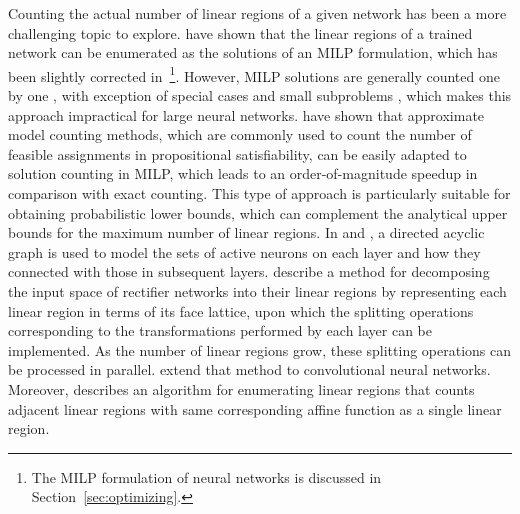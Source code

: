 Counting the actual number of linear regions of a given network has been a more challenging topic to explore. 
\cite{serra2018bounding} have shown that the linear regions of a trained network can be enumerated as the solutions of an MILP formulation, 
which has been slightly corrected in~\cite{cai2023pruning}\footnote{The MILP formulation of neural networks is discussed in Section~\ref{sec:optimizing}.}. 
However, MILP solutions are generally counted one by one \citep{danna2007multiple}, with exception of special cases \citep{serra2020nearoptimal} and small subproblems \citep{serra2020enumerative}, which makes this approach impractical for large neural networks. 
\cite{serra2020empirical} have shown that approximate model counting methods, which are commonly used to count the number of feasible assignments in propositional satisfiability, can be easily adapted to solution counting in MILP, which leads to an order-of-magnitude speedup in comparison with exact counting. 
This type of approach is particularly suitable for obtaining probabilistic lower bounds, which can complement the analytical upper bounds for the maximum number of linear regions.  
In \cite{craighero2020compositional} and \cite{craighero2020understanding}, a directed acyclic graph is used to model the sets of active neurons on each layer and how they connected with those in subsequent layers. 
\cite{yang2020reachability} describe a method for decomposing the input space of rectifier networks into their linear regions by representing each linear region in terms of its face lattice, upon which the splitting operations corresponding to the transformations performed by each layer can be implemented. As the number of linear regions grow, these splitting operations can be processed in parallel. \cite{yang2021reachability} extend that method to convolutional neural networks. 
Moreover, \cite{wang2022estimation} describes an algorithm for enumerating linear regions that counts adjacent linear regions with same corresponding affine function as a single linear region. 

